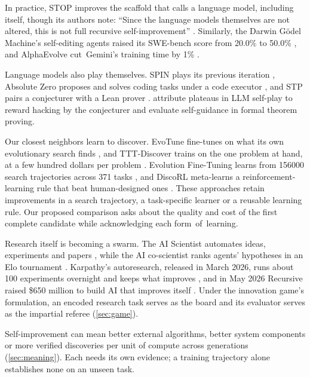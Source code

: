In practice, STOP improves the scaffold that calls a language model, including
itself, though its authors note: ``Since the language models themselves are
not altered, this is not full recursive self-improvement''
\citep{zelikman2024stop}. Similarly, the Darwin G\"odel Machine's self-editing agents
raised its SWE-bench score from 20.0\% to 50.0\% \citep{zhang2025dgm}, and
AlphaEvolve \mbox{cut Gemini's} training time by 1\%
\citep{novikov2025alphaevolve}.

Language models also play themselves. SPIN plays its previous iteration
\citep{chen2024spin}, Absolute Zero proposes and solves coding tasks under a
code executor \citep{zhao2025absolutezero}, and STP pairs a conjecturer with
a Lean prover \citep{dong2025stp}. \citet{bailey2026sgs} attribute plateaus
in LLM self-play to reward hacking by the conjecturer and evaluate
self-guidance in formal theorem proving.

Our closest neighbors learn to discover. EvoTune
fine-tunes on what its own evolutionary search finds \citep{evotune2025},
and TTT-Discover trains on the one problem at hand, at a few hundred
dollars per problem \citep{tttdiscover2026}. Evolution Fine-Tuning learns
from \num{156000} search trajectories across 371 tasks \citep{eft2026}, and
DiscoRL meta-learns a reinforcement-learning rule that beat human-designed
ones \citep{oh2025discorl}. These approaches retain improvements in a search trajectory, a
task-specific learner or a reusable learning rule. Our proposed comparison
asks about the quality and cost of the first complete candidate while
acknowledging each \mbox{form of learning}.

Research itself is becoming a swarm. The AI Scientist automates ideas,
experiments and papers \citep{lu2024aiscientist}, while the AI co-scientist
ranks agents' hypotheses in an Elo tournament
\citep{gottweis2025coscientist}. Karpathy's autoresearch, released in March
2026, runs about 100 experiments overnight and keeps what improves
\citep{karpathy2026autoresearch}, and in May 2026 Recursive raised
\$650 million to build AI that improves itself
\citep{recursive2026techcrunch}. Under the innovation game's formulation, an encoded research task serves as the board and
its evaluator serves as the impartial referee (\cref{sec:game}).

Self-improvement can mean better external algorithms, better system
components or more verified discoveries per unit of compute across
generations (\cref{sec:meaning}). Each needs its own evidence; a training
trajectory alone establishes none on an unseen task.


